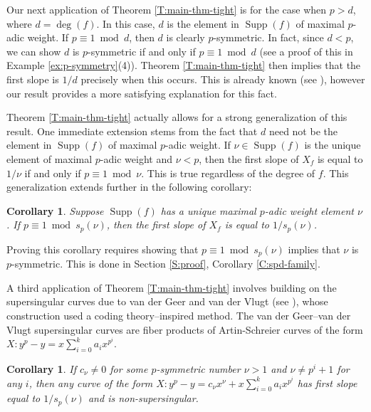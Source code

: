 \documentclass{amsart}
\numberwithin{equation}{section}
\DeclareMathOperator{\Supp}{Supp}
\theoremstyle{plain}
\newtheorem{corollary}[theorem]{Corollary}
\theoremstyle{definition}
\begin{document}
Our next application of Theorem \ref{T:main-thm-tight} is 
for the case when $p > d$, where $d = \deg(f)$.
In this case, $d$ is the element in $\Supp(f)$
of maximal $p$-adic weight.
If $p \equiv 1 \bmod{d}$,
then $d$ is clearly $p$-symmetric.
In fact, since $d<p$, we can show 
$d$ is $p$-symmetric if and only if $p\equiv 1\bmod d$
(see a proof of this in Example \ref{ex:p-symmetry}(4)). 
Theorem \ref{T:main-thm-tight} then implies that the first slope is
$1/d$ precisely when this occurs.
This is already known (see \cite{AS89}\cite{Wan93}\cite{SZ03}),
however our result provides a more satisfying
explanation for this fact.

Theorem \ref{T:main-thm-tight} actually allows for a strong generalization
of this result.
One immediate extension stems from the fact that $d$ need not be the
element in $\Supp(f)$ of maximal $p$-adic weight.
If $\nu \in \Supp(f)$ is the unique element of maximal $p$-adic weight
and $\nu < p$, then the first slope of $X_f$ is equal to $1/\nu$
if and only if $p \equiv 1 \bmod{\nu}$.
This is true
regardless of the degree of $f$.
This generalization extends further in the following corollary:

\begin{corollary}
    \label{C:spd-family-1}
   Suppose $\Supp(f)$ has a unique maximal $p$-adic weight element $\nu$. 
If $p\equiv 1\bmod s_p(\nu)$, 
then the first slope of $X_f$ is equal to $1/s_p(\nu)$.
\end{corollary}

Proving this corollary requires showing that
$p \equiv 1 \bmod{s_p(\nu)}$ implies that $\nu$
is $p$-symmetric.
This is done in Section \ref{S:proof},
Corollary \ref{C:spd-family}.

A third application of Theorem \ref{T:main-thm-tight} involves building on the
supersingular curves due to van der Geer and van der Vlugt
(see \cite{GV92}), whose construction used a coding theory--inspired method.
The van der Geer--van der Vlugt supersingular curves are fiber products of
Artin-Schreier curves 
of the form $X : y^p - y = x\sum_{i=0}^k a_i x^{p^i}$.

\begin{corollary}
    \label{C:ss-van-der-Geer}
    If $c_\nu\ne 0$ for some $p$-symmetric number $\nu>1$
    and $\nu \ne p^i+1$ for any $i$, then any curve of the form
$X: y^p-y = c_\nu x^\nu + x\sum_{i=0}^{k}a_i x^{p^i}$ has first slope equal to
$1/s_p(\nu)$ and is non-supersingular.
\end{corollary}
\end{document}
